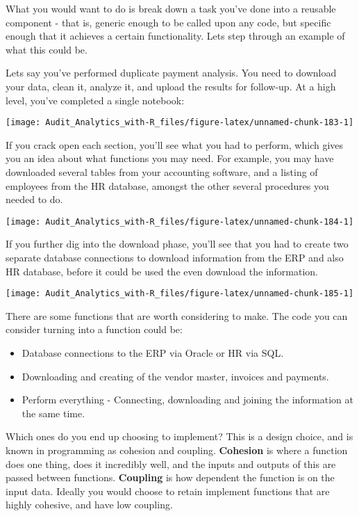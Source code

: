 \documentclass[
]{book}
\providecommand{\tightlist}{%
  \setlength{\itemsep}{0pt}\setlength{\parskip}{0pt}}
\begin{document}
What you would want to do is break down a task you've done into a reusable component - that is, generic enough to be called upon any code, but specific enough that it achieves a certain functionality. Lets step through an example of what this could be.

Lets say you've performed duplicate payment analysis. You need to download your data, clean it, analyze it, and upload the results for follow-up. At a high level, you've completed a single notebook:

\texttt{[image: Audit\_Analytics\_with-R\_files/figure-latex/unnamed-chunk-183-1]}

If you crack open each section, you'll see what you had to perform, which gives you an idea about what functions you may need. For example, you may have downloaded several tables from your accounting software, and a listing of employees from the HR database, amongst the other several procedures you needed to do.

\texttt{[image: Audit\_Analytics\_with-R\_files/figure-latex/unnamed-chunk-184-1]}

If you further dig into the download phase, you'll see that you had to create two separate database connections to download information from the ERP and also HR database, before it could be used the even download the information.

\texttt{[image: Audit\_Analytics\_with-R\_files/figure-latex/unnamed-chunk-185-1]}

There are some functions that are worth considering to make. The code you can consider turning into a function could be:

\begin{itemize}
\tightlist
\item
  Database connections to the ERP via Oracle or HR via SQL.
\item
  Downloading and creating of the vendor master, invoices and payments.
\item
  Perform everything - Connecting, downloading and joining the information at the same time.
\end{itemize}

Which ones do you end up choosing to implement? This is a design choice, and is known in programming as cohesion and coupling. \textbf{Cohesion} is where a function does one thing, does it incredibly well, and the inputs and outputs of this are passed between functions. \textbf{Coupling} is how dependent the function is on the input data. Ideally you would choose to retain implement functions that are highly cohesive, and have low coupling.
\end{document}
